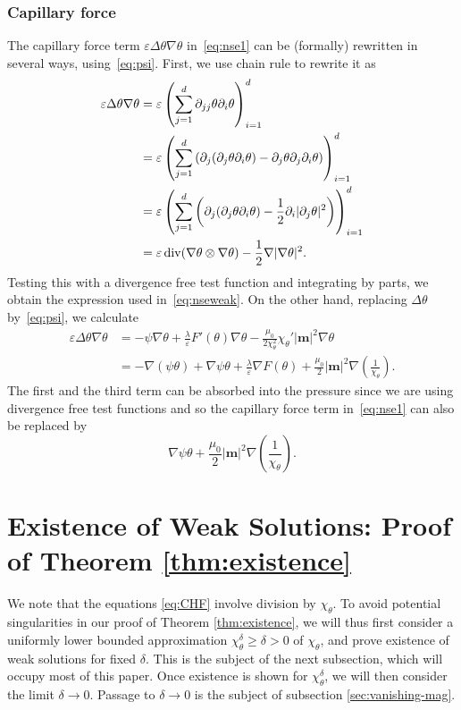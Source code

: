 \documentclass[10pt,letterpaper,twoside]{amsart}
\theoremstyle{definition}{\newtheorem{definition}[lemma]{Definition}}
\theoremstyle{note}{\newtheorem{claim}{Claim}[section]
\newtheorem*{claim*}{Claim}}
\numberwithin{equation}{section}
\newcommand{\Grad}{\nabla}
\newcommand{\Div}{\operatorname{div}}
\newcommand{\bm}{\mathbf{m}}
\begin{document}
\subsubsection{Capillary force}
	The capillary force term $\varepsilon \Delta \theta\Grad\theta$ in~\eqref{eq:nse1} can be (formally) rewritten in several ways, using~\eqref{eq:psi}. First, we use chain rule to rewrite it as  
	\begin{align}\label{eq:capillary}
		\varepsilon\Delta \theta \Grad\theta & = \varepsilon \left(\sum_{j=1}^d \partial_{jj} \theta\partial_i\theta\right)_{i=1}^d\\
		& = \varepsilon  \left(\sum_{j=1}^d \left(\partial_j(\partial_j\theta\partial_i \theta) - \partial_j\theta\partial_j\partial_i \theta \right)\right)_{i=1}^d\notag\\
		& = \varepsilon  \left(\sum_{j=1}^d \left(\partial_j(\partial_j\theta\partial_i \theta) -\frac12 \partial_i |\partial_j\theta|^2  \right)\right)_{i=1}^d\notag\\
		&  = \varepsilon  \Div (\Grad\theta\otimes\Grad \theta) - \frac{1}{2}\Grad |\Grad\theta|^2. \notag
	\end{align}
	Testing this with a divergence free test function and integrating by parts, we obtain the expression used in~\eqref{eq:nseweak}. On the other hand, replacing $\Delta \theta$ by~\eqref{eq:psi}, we calculate
	\begin{align*}
		\varepsilon\Delta \theta \Grad\theta &= -\psi \Grad\theta + \frac{\lambda}{\varepsilon}F'(\theta)\Grad\theta -\frac{\mu_0}{2\chi_\theta^2}\chi_\theta' |\bm|^2 \Grad\theta\\
		& = -\Grad(\psi\theta)+\Grad\psi \theta +\frac{\lambda}{\varepsilon}\Grad F(\theta)+\frac{\mu_0}{2} |\bm|^2 \Grad\left(\frac{1}{\chi_\theta}\right).
	\end{align*}
	The first and the third term can be absorbed into the pressure since we are using divergence free test functions and so the capillary force term in~\eqref{eq:nse1} can also be replaced by
	\begin{equation*}
		\Grad\psi \theta  +\frac{\mu_0}{2} |\bm|^2 \Grad\left(\frac{1}{\chi_\theta}\right).
	\end{equation*}
	
\section{Existence of Weak Solutions: Proof of Theorem \ref{thm:existence}}
\label{sec:existenceproof}
We note that the equations \eqref{eq:CHF} involve division by $\chi_\theta$. To avoid potential singularities in our proof of Theorem \ref{thm:existence}, we will thus first consider a uniformly lower bounded approximation $\chi^\delta_\theta \ge \delta >0$ of $\chi_\theta$, and prove existence of weak solutions for fixed $\delta$. This is the subject of the next subsection, which will occupy most of this paper. Once existence is shown for $\chi^\delta_\theta$, we will then consider the limit $\delta \to 0$. Passage to $\delta \to 0$ is the subject of subsection \ref{sec:vanishing-mag}.
\end{document}
